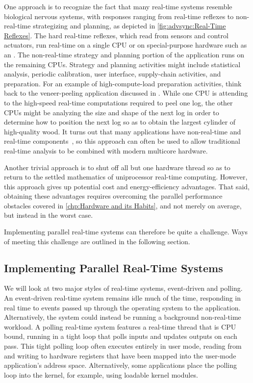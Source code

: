 One approach is to recognize the fact that many real-time systems
resemble biological nervous systems, with responses ranging from
real-time reflexes to non-real-time strategizing and planning,
as depicted in
\cref{fig:advsync:Real-Time Reflexes}.
The hard real-time reflexes, which read from sensors and control
actuators, run real-time on a single CPU or on special-purpose hardware
such as an \@.
The non-real-time strategy and planning portion of the application runs
on the remaining CPUs.
Strategy and planning activities might include statistical analysis,
periodic calibration, user interface, supply-chain activities, and
preparation.
For an example of high-compute-load preparation activities, think back
to the veneer-peeling application discussed in
.
While one CPU is attending to the high-speed real-time computations
required to peel one log, the other CPUs might be analyzing the size
and shape of the next log in order to determine how to position the
next log so as to obtain the largest cylinder of high-quality wood.
It turns out that many applications have non-real-time and real-time
components~\cite{RobertBerry2008IBMSysJ}, so this approach can
often be used to allow traditional real-time analysis to be combined
with modern multicore hardware.

Another trivial approach is to shut off all but one hardware thread so as
to return to the settled mathematics of uniprocessor real-time
computing.
However, this approach gives up potential cost and energy-efficiency
advantages.
That said, obtaining these advantages requires overcoming the parallel
performance obstacles covered in
\cref{chp:Hardware and its Habits},
and not merely on average, but instead in the worst case.

Implementing parallel real-time systems can therefore be quite a
challenge.
Ways of meeting this challenge are outlined in the following section.

\subsection{Implementing Parallel Real-Time Systems}
\label{sec:advsync:Implementing Parallel Real-Time Systems}

We will look at two major styles of real-time systems, event-driven and
polling.
An event-driven real-time system remains idle much of the time, responding
in real time to events passed up through the operating system to the
application.
Alternatively, the system could instead be running a background
non-real-time workload.
A polling real-time system features a real-time thread that is CPU
bound, running in a tight loop that polls inputs and updates outputs on
each pass.
This tight polling loop often executes entirely in user mode, reading from
and writing to hardware registers that have been mapped into the user-mode
application's address space.
Alternatively, some applications place the polling loop into the kernel,
for example, using loadable kernel modules.

